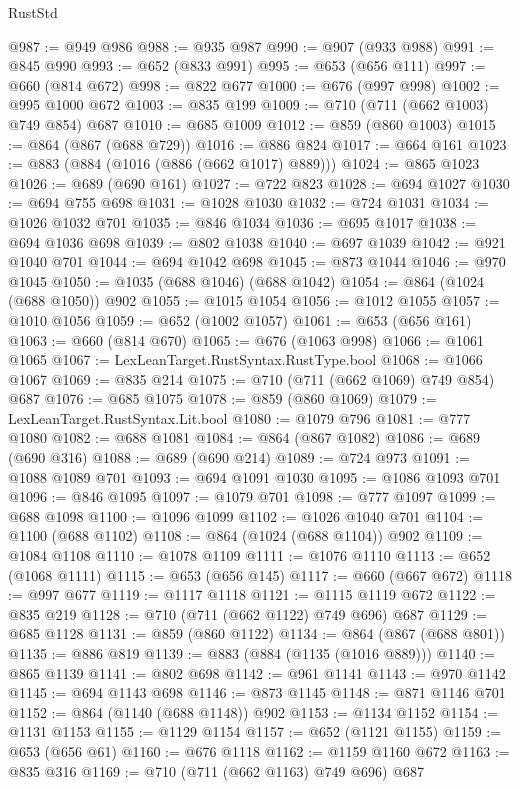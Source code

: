 \begin{lexlean}{RustStd}
\begin{coremodule}
@987 := @949 @986
@988 := @935 @987
@990 := @907 (@933 @988)
@991 := @845 @990
@993 := @652 (@833 @991)
@995 := @653 (@656 @111)
@997 := @660 (@814 @672)
@998 := @822 @677
@1000 := @676 (@997 @998)
@1002 := @995 @1000 @672
@1003 := @835 @199
@1009 := @710 (@711 (@662 @1003) @749 @854) @687
@1010 := @685 @1009
@1012 := @859 (@860 @1003)
@1015 := @864 (@867 (@688 @729))
@1016 := @886 @824
@1017 := @664 @161
@1023 := @883 (@884 (@1016 (@886 (@662 @1017) @889)))
@1024 := @865 @1023
@1026 := @689 (@690 @161)
@1027 := @722 @823
@1028 := @694 @1027
@1030 := @694 @755 @698
@1031 := @1028 @1030
@1032 := @724 @1031
@1034 := @1026 @1032 @701
@1035 := @846 @1034
@1036 := @695 @1017
@1038 := @694 @1036 @698
@1039 := @802 @1038
@1040 := @697 @1039
@1042 := @921 @1040 @701
@1044 := @694 @1042 @698
@1045 := @873 @1044
@1046 := @970 @1045
@1050 := @1035 (@688 @1046) (@688 @1042)
@1054 := @864 (@1024 (@688 @1050)) @902
@1055 := @1015 @1054
@1056 := @1012 @1055
@1057 := @1010 @1056
@1059 := @652 (@1002 @1057)
@1061 := @653 (@656 @161)
@1063 := @660 (@814 @670)
@1065 := @676 (@1063 @998)
@1066 := @1061 @1065
@1067 := LexLeanTarget.RustSyntax.RustType.bool
@1068 := @1066 @1067
@1069 := @835 @214
@1075 := @710 (@711 (@662 @1069) @749 @854) @687
@1076 := @685 @1075
@1078 := @859 (@860 @1069)
@1079 := LexLeanTarget.RustSyntax.Lit.bool
@1080 := @1079 @796
@1081 := @777 @1080
@1082 := @688 @1081
@1084 := @864 (@867 @1082)
@1086 := @689 (@690 @316)
@1088 := @689 (@690 @214)
@1089 := @724 @973
@1091 := @1088 @1089 @701
@1093 := @694 @1091 @1030
@1095 := @1086 @1093 @701
@1096 := @846 @1095
@1097 := @1079 @701
@1098 := @777 @1097
@1099 := @688 @1098
@1100 := @1096 @1099
@1102 := @1026 @1040 @701
@1104 := @1100 (@688 @1102)
@1108 := @864 (@1024 (@688 @1104)) @902
@1109 := @1084 @1108
@1110 := @1078 @1109
@1111 := @1076 @1110
@1113 := @652 (@1068 @1111)
@1115 := @653 (@656 @145)
@1117 := @660 (@667 @672)
@1118 := @997 @677
@1119 := @1117 @1118
@1121 := @1115 @1119 @672
@1122 := @835 @219
@1128 := @710 (@711 (@662 @1122) @749 @696) @687
@1129 := @685 @1128
@1131 := @859 (@860 @1122)
@1134 := @864 (@867 (@688 @801))
@1135 := @886 @819
@1139 := @883 (@884 (@1135 (@1016 @889)))
@1140 := @865 @1139
@1141 := @802 @698
@1142 := @961 @1141
@1143 := @970 @1142
@1145 := @694 @1143 @698
@1146 := @873 @1145
@1148 := @871 @1146 @701
@1152 := @864 (@1140 (@688 @1148)) @902
@1153 := @1134 @1152
@1154 := @1131 @1153
@1155 := @1129 @1154
@1157 := @652 (@1121 @1155)
@1159 := @653 (@656 @61)
@1160 := @676 @1118
@1162 := @1159 @1160 @672
@1163 := @835 @316
@1169 := @710 (@711 (@662 @1163) @749 @696) @687

\end{coremodule}
\end{lexlean}
